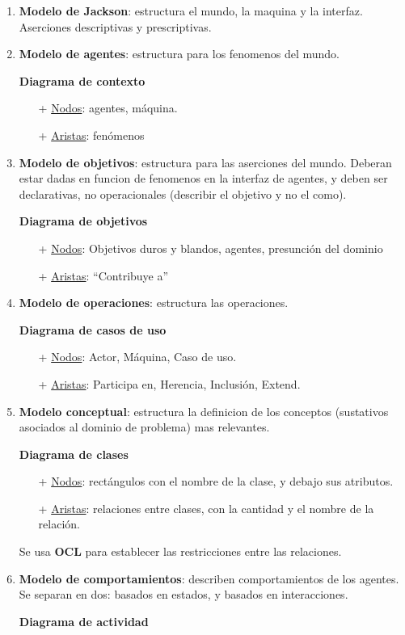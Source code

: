 \begin{enumerate}
\item {\bf Modelo de Jackson}: estructura el mundo, la maquina y la interfaz. Aserciones descriptivas y prescriptivas. 

\item {\bf Modelo de agentes}: estructura para los fenomenos del mundo.

{\bf Diagrama de contexto}
\begin{itemize}
  \item[+] \underline{Nodos}: agentes, m\'aquina. 
  \item[+] \underline{Aristas}: fen\'omenos
\end{itemize}

\item {\bf Modelo de objetivos}: estructura para las aserciones del mundo. Deberan estar dadas en funcion de fenomenos en la interfaz de agentes, y deben ser declarativas, no operacionales (describir el objetivo y no el como). 

{\bf Diagrama de objetivos}
\begin{itemize}
  \item[+] \underline{Nodos}: Objetivos duros y blandos, agentes, presunci\'on del dominio
  \item[+] \underline{Aristas}: ``Contribuye a''
\end{itemize}

\item {\bf Modelo de operaciones}: estructura las operaciones. 

{\bf Diagrama de casos de uso}
\begin{itemize}
  \item[+] \underline{Nodos}: Actor, M\'aquina, Caso de uso. 
  \item[+] \underline{Aristas}: Participa en, Herencia, Inclusi\'on, Extend. 
\end{itemize}

\item {\bf Modelo conceptual}: estructura la definicion de los conceptos (sustativos asociados al dominio de problema) mas relevantes. 

{\bf Diagrama de clases}
\begin{itemize}
  \item[+] \underline{Nodos}: rect\'angulos con el nombre de la clase, y debajo sus atributos.
  \item[+] \underline{Aristas}: relaciones entre clases, con la cantidad y el nombre de la relaci\'on. 
\end{itemize}

Se usa {\bf OCL} para establecer las restricciones entre las relaciones.

\item {\bf Modelo de comportamientos}: describen comportamientos de los agentes. Se separan en dos: basados en estados, y basados en interacciones. 

{\bf Diagrama de actividad}
      
\end{enumerate}

